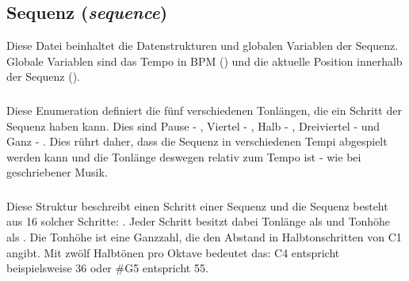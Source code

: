 \subsection{Sequenz (\emph{sequence})}
Diese Datei beinhaltet die Datenstrukturen und globalen Variablen der Sequenz. Globale Variablen sind das Tempo in BPM () und die aktuelle Position innerhalb der Sequenz ().

\subsubsection{}
Diese Enumeration definiert die fünf verschiedenen Tonlängen, die ein Schritt der Sequenz haben kann. Dies sind Pause - , Viertel - , Halb - , Dreiviertel -  und Ganz - . Dies rührt daher, dass die Sequenz in verschiedenen Tempi abgespielt werden kann und die Tonlänge deswegen relativ zum Tempo ist - wie bei geschriebener Musik.

\subsubsection{}
Diese Struktur beschreibt einen Schritt einer Sequenz und die Sequenz besteht aus 16 solcher Schritte: . Jeder Schritt besitzt dabei Tonlänge als  und Tonhöhe als . Die Tonhöhe ist eine Ganzzahl, die den Abstand in Halbtonschritten von C1 angibt. Mit zwölf Halbtönen pro Oktave bedeutet das: C4 entspricht beispielsweise 36 oder \#G5 entspricht 55.
